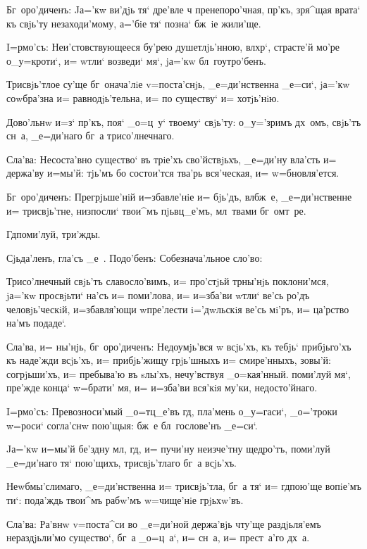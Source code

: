 Бг~оро'диченъ: Jа='кw ви'дjь тя` дре'вле ч 
пренепоро'чная, пр'къ, зря^щая врата` къ свjь'ту 
незаходи'мому, а='бiе тя` позна` бж~iе жили'ще.


I=рмо'съ: Неи'стовствующееся бу'рею душетлjь'нною, 
вл хр`, страсте'й мо'ре о_у=кроти`, и= w\т тли` 
возведи` мя`, jа='кw бл~гоутро'бенъ.

Трисвjь'тлое су'ще бг~онача'лiе v=поста'снjь, 
_е=ди'нственна _е=си`, jа='кw соwбра'зна и= 
равнодjь'тельна, и= по существу` и= хотjь'нiю. 

Дово'льнw и=з` пр'къ, поя` _о=ц~у` твоему` 
свjь'ту: о_у='зримъ дх~омъ, свjь'тъ сн~а, _е=ди'наго бг~а 
трисо'лнечнаго. 

Сла'ва: Несоста'вно существо` въ трiе'хъ сво'йствjьхъ, 
_е=ди'ну вла'сть и= держа'ву и=мы'й: тjь'мъ бо состои'тся 
тва'рь вся'ческая, и= w=бновля'ется.

Бг~оро'диченъ: Прегрjьше'нiй и=збавле'нiе и= бjь'дъ, 
вл бж~е, _е=ди'нственне и= трисвjь'тне, низпосли` 
твои^мъ пjьвц_е'мъ, мл~твами бг~омт~ре.

Гд поми'луй, три'жды.

Сjьда'ленъ, гла'съ _е~. Подо'бенъ: Собезнача'льное 
сло'во:

Трисо'лнечный свjь'тъ славосло'вимъ, и= про'стjьй 
тр ны'нjь поклони'мся, jа='кw просвjьти` на'съ и= 
поми'лова, и= и=зба'ви w\т тли` ве'сь ро'дъ 
человjь'ческiй, и=збавля'ющи w\т пре'лести i='дwльскiя 
ве'сь мi'ръ, и= ца'рство на'мъ подаде`.

Сла'ва, и= ны'нjь, бг~оро'диченъ: Недоумjь'вся w\т 
всjь'хъ, къ тебjь` прибjьго'хъ къ наде'жди всjь'хъ, и= 
прибjь'жищу грjь'шныхъ и= смире'нныхъ, зовы'й: 
согрjьши'хъ, и= пребыва'ю въ sлы'хъ, нечу'вствуя 
_о=кая'нный. поми'луй мя`, пре'жде конца` w=брати' мя, и= 
и=зба'ви вся'кiя му'ки, недосто'йнаго.


I=рмо'съ: Превозноси'мый _о=тц_е'въ гд, пла'мень 
о_у=гаси`, _о='троки w=роси` согла'снw пою'щыя: бж~е 
бл~гослове'нъ _е=си`.

Jа='кw и=мы'й бе'здну мл, гд, и= пучи'ну 
неизче'тну щедро'тъ, поми'луй _е=ди'наго тя` пою'щихъ, 
трисвjь'тлаго бг~а всjь'хъ.

Неwбмы'слимаго, _е=ди'нственна и= трисвjь'тла, бг~а 
тя` и= гд пою'ще вопiе'мъ ти`: пода'ждь твои^мъ 
рабw'мъ w=чище'нiе грjьхw'въ.

Сла'ва: Ра'внw v=поста^си во _е=ди'ной держа'вjь 
чту'ще раздjьля'емъ нераздjьли'мо существо`, бг~а 
_о=ц~а`, и= сн~а, и= прест~а'го дх~а.

